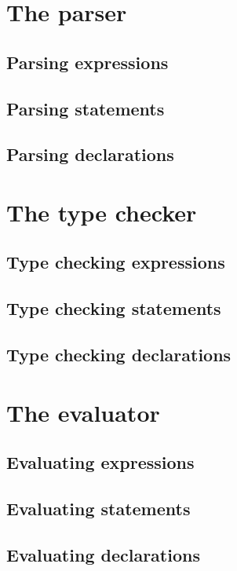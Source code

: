 \documentclass[11pt, american, draft]{PhdThesis}
\begin{document}
  \section{The parser}

  \subsection{Parsing expressions}

  \subsection{Parsing statements}

  \subsection{Parsing declarations}

  \section{The type checker}

  \subsection{Type checking expressions}

  \subsection{Type checking statements}

  \subsection{Type checking declarations}

  \section{The evaluator}

  \subsection{Evaluating expressions}

  \subsection{Evaluating statements}

  \subsection{Evaluating declarations}
\end{document}
